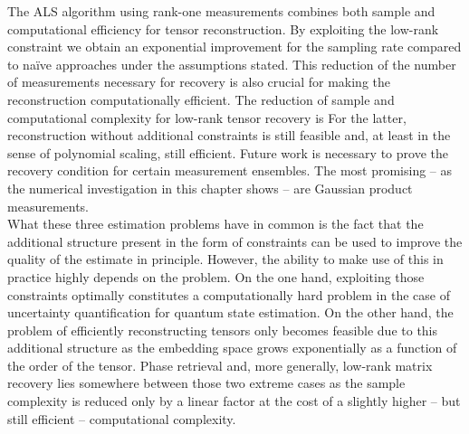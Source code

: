 The ALS algorithm using rank-one measurements combines both sample and computational efficiency for tensor reconstruction.
By exploiting the low-rank constraint we obtain an exponential improvement for the sampling rate compared to na\"ive approaches under the assumptions stated.
This reduction of the number of measurements necessary for recovery is also crucial for making the reconstruction computationally efficient.
The reduction of sample and computational complexity for low-rank tensor recovery is
For the latter, reconstruction without additional constraints is still feasible and, at least in the sense of polynomial scaling, still efficient.
Future work is necessary to prove the recovery condition for certain measurement ensembles.
The most promising -- as the numerical investigation in this chapter shows -- are Gaussian product measurements.\\



What these three estimation problems have in common is the fact that the additional structure present in the form of constraints can be used to improve the quality of the estimate in principle.
However, the ability to make use of this in practice highly depends on the problem.
On the one hand, exploiting those constraints optimally constitutes a computationally hard problem in the case of uncertainty quantification for quantum state estimation.
On the other hand, the problem of efficiently reconstructing tensors only becomes feasible due to this additional structure as the embedding space grows exponentially as a function of the order of the tensor.
Phase retrieval and, more generally, low-rank matrix recovery lies somewhere between those two extreme cases as the sample complexity is reduced only by a linear factor at the cost of a slightly higher -- but still efficient -- computational complexity.

